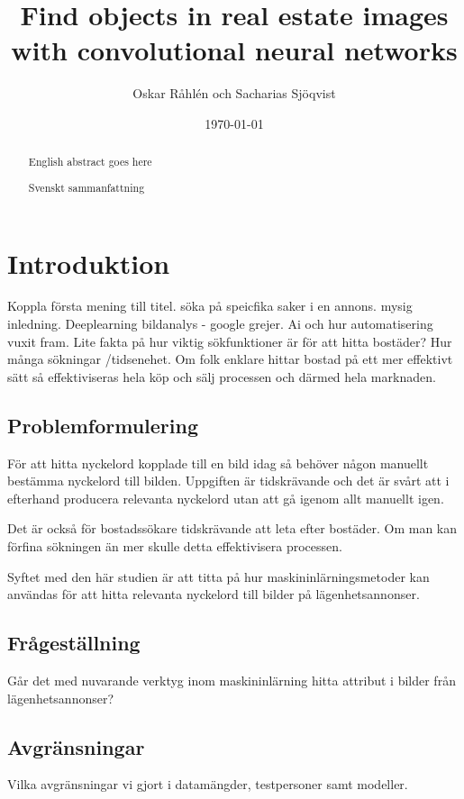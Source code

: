 \documentclass[]{kththesis}
\title{Find objects in real estate images with convolutional neural networks}
\author{Oskar Råhlén och Sacharias Sjöqvist}
\date{\today}
\begin{document}
\frontmatter

\begin{abstract}
    English abstract goes here
\end{abstract}

\begin{otherlanguage}{swedish}
  \begin{abstract}
    Svenskt sammanfattning
  \end{abstract}
\end{otherlanguage}
  
\tableofcontents

\mainmatter

\chapter{Introduktion}
Koppla första mening till titel. söka på speicfika saker i en annons. mysig inledning. Deeplearning bildanalys - google grejer. Ai och hur automatisering vuxit fram. Lite fakta på hur viktig sökfunktioner är för att hitta bostäder? Hur många sökningar /tidsenehet. Om folk enklare hittar bostad på ett mer effektivt sätt så effektiviseras hela köp och sälj processen och därmed hela marknaden.

\section{Problemformulering}
För att hitta nyckelord kopplade till en bild idag så behöver någon manuellt bestämma nyckelord till bilden. Uppgiften är tidskrävande och det är svårt att i efterhand producera relevanta nyckelord utan att gå igenom allt manuellt igen. 

Det är också för bostadssökare tidskrävande att leta efter bostäder. Om man kan förfina sökningen än mer skulle detta effektivisera processen.

Syftet med den här studien är att titta på hur maskininlärningsmetoder kan användas för att hitta relevanta nyckelord till bilder på lägenhetsannonser. 

\section{Frågeställning}
Går det med nuvarande verktyg inom maskininlärning hitta attribut i bilder från lägenhetsannonser?

\section{Avgränsningar}
Vilka avgränsningar vi gjort i datamängder, testpersoner samt modeller.
\end{document}

